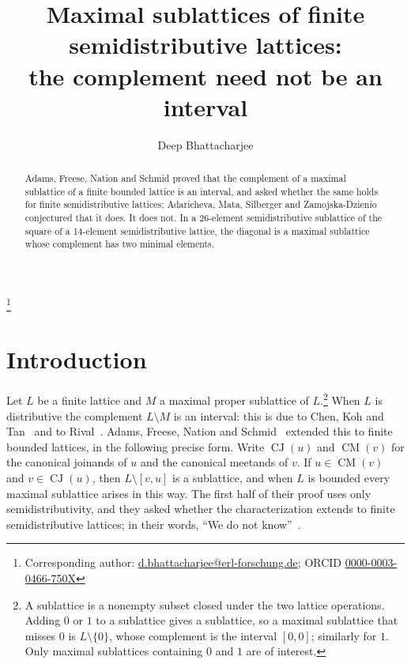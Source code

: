 \documentclass[11pt]{amsart}
\theoremstyle{definition}
\theoremstyle{remark}
\numberwithin{equation}{section}
\begin{document}
\title[Maximal sublattices of semidistributive lattices]{Maximal sublattices of finite semidistributive lattices:\\ the complement need not be an interval}

\author{Deep Bhattacharjee}
\address{Formerly, Electro-Gravitational Space Propulsion Laboratory (EGSPL),\newline Bhubaneswar, Odisha 751030, India}
\thanks{Corresponding author: \href{mailto:d.bhattacharjee@erl-forschung.de}{d.bhattacharjee@erl-forschung.de}; ORCID \href{https://orcid.org/0000-0003-0466-750X}{\mbox{0000-0003-0466-750X}}}


\begin{abstract}
Adams, Freese, Nation and Schmid proved that the complement of a maximal sublattice of a finite bounded lattice is an interval, and asked whether the same holds for finite semidistributive lattices; Adaricheva, Mata, Silberger and Zamojska-Dzienio conjectured that it does. It does not. In a 26-element semidistributive sublattice of the square of a 14-element semidistributive lattice, the diagonal is a maximal sublattice whose complement has two minimal elements.
\end{abstract}

\maketitle

\section{Introduction}

Let $L$ be a finite lattice and $M$ a maximal proper sublattice of $L$.\footnote{A sublattice is a nonempty subset closed under the two lattice operations. Adding $0$ or $1$ to a sublattice gives a sublattice, so a maximal sublattice that misses $0$ is $L\setminus\{0\}$, whose complement is the interval $[0,0]$; similarly for $1$. Only maximal sublattices containing $0$ and $1$ are of interest.} When $L$ is distributive the complement $L\setminus M$ is an interval: this is due to Chen, Koh and Tan~\cite{CKT} and to Rival~\cite{Ri}. Adams, Freese, Nation and Schmid~\cite[Theorem~7]{AFNS} extended this to finite bounded lattices, in the following precise form. Write $\operatorname{CJ}(u)$ and $\operatorname{CM}(v)$ for the canonical joinands of $u$ and the canonical meetands of $v$. If $u\in\operatorname{CM}(v)$ and $v\in\operatorname{CJ}(u)$, then $L\setminus[v,u]$ is a sublattice, and when $L$ is bounded every maximal sublattice arises in this way. The first half of their proof uses only semidistributivity, and they asked whether the characterization extends to finite semidistributive lattices; in their words, ``We do not know''~\cite[after Theorem~7]{AFNS}.
\end{document}
